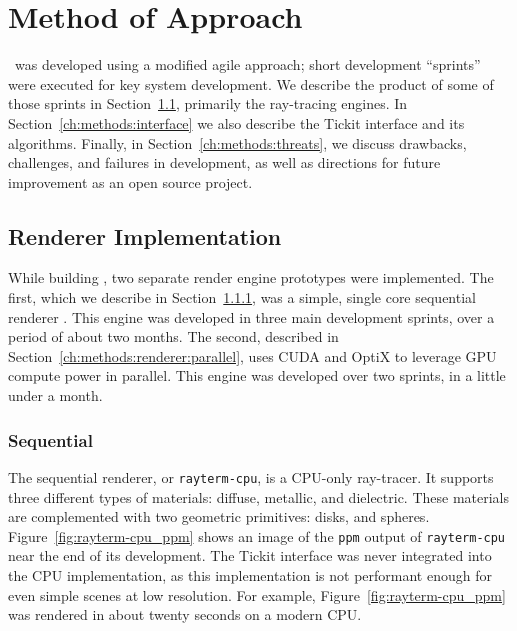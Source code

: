 %
%
%
\chapter{Method of Approach} \label{ch:methods}

\name\ was developed using a modified agile approach; short development ``sprints'' were executed for key system development.
We describe the product of some of those sprints in Section~\ref{ch:methods:renderer}, primarily the ray-tracing engines.
In Section~\ref{ch:methods:interface} we also describe the Tickit interface and its algorithms.
Finally, in Section~\ref{ch:methods:threats}, we discuss drawbacks, challenges, and failures in development, as well as directions for future improvement as an open source project.


\section{Renderer Implementation} \label{ch:methods:renderer}
While building \name, two separate render engine prototypes were implemented.
The first, which we describe in Section~\ref{ch:methods:renderer:sequential}, was a simple, single core sequential renderer \cite{raytermCpuImpl}.
This engine was developed in three main development sprints, over a period of about two months.
The second, described in Section~\ref{ch:methods:renderer:parallel}, uses CUDA \cite{nvidia2011cuda} and OptiX \cite{parker2010optix} to leverage GPU compute power in parallel.
This engine was developed over two sprints, in a little under a month.


\subsection{Sequential} \label{ch:methods:renderer:sequential}

The sequential renderer, or \texttt{rayterm-cpu}, is a CPU-only ray-tracer.
It supports three different types of materials: diffuse, metallic, and dielectric.
These materials are complemented with two geometric primitives: disks, and spheres.
Figure~\ref{fig:rayterm-cpu_ppm} shows an image of the \texttt{ppm} output of \texttt{rayterm-cpu} near the end of its development.
The Tickit interface was never integrated into the CPU implementation, as this implementation is not performant enough for even simple scenes at low resolution.
For example, Figure~\ref{fig:rayterm-cpu_ppm} was rendered in about twenty seconds on a modern CPU.


